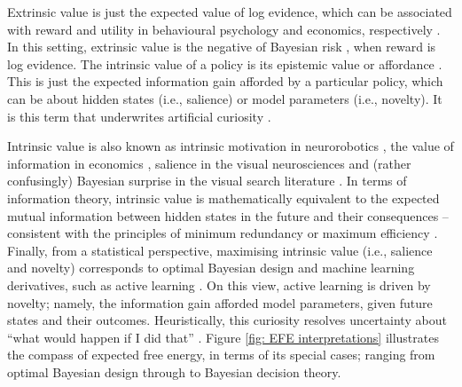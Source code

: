 \documentclass{article}
\begin{document}
Extrinsic value is just the expected value of log evidence, which can be associated with reward and utility in behavioural psychology and economics, respectively \cite{bartoNoveltySurprise2013,kauderGenesisMarginalUtility1953,schmidhuberFormalTheoryCreativity2010}. In this setting, extrinsic value is the negative of Bayesian risk \cite{bergerStatisticalDecisionTheory1985}, when reward is log evidence. The intrinsic value of a policy is its epistemic value or affordance \cite{fristonActiveInferenceEpistemic2015}. This is just the expected information gain afforded by a particular policy, which can be about hidden states (i.e., salience) or model parameters (i.e., novelty). It is this term that underwrites artificial curiosity \cite{schmidhuberDevelopmentalRoboticsOptimal2006}.

Intrinsic value is also known as intrinsic motivation in neurorobotics \cite{bartoNoveltySurprise2013,oudeyerWhatIntrinsicMotivation2009,deciIntrinsicMotivationSelfDetermination1985}, the value of information in economics \cite{howardInformationValueTheory1966}, salience in the visual neurosciences and (rather confusingly) Bayesian surprise in the visual search literature \cite{ittiBayesianSurpriseAttracts2009,schwartenbeckExplorationNoveltySurprise2013,sunPlanningBeSurprised2011}. In terms of information theory, intrinsic value is mathematically equivalent to the expected mutual information between hidden states in the future and their consequences – consistent with the principles of minimum redundancy or maximum efficiency \cite{barlowPossiblePrinciplesUnderlying1961,barlowInductiveInferenceCoding1974,linskerPerceptualNeuralOrganization1990}. Finally, from a statistical perspective, maximising intrinsic value (i.e., salience and novelty) corresponds to optimal Bayesian design \cite{lindleyMeasureInformationProvided1956} and machine learning derivatives, such as active learning \cite{mackayInformationBasedObjectiveFunctions1992}. On this view, active learning is driven by novelty; namely, the information gain afforded model parameters, given future states and their outcomes. Heuristically, this curiosity resolves uncertainty about “what would happen if I did that” \cite{schmidhuberFormalTheoryCreativity2010}. Figure \ref{fig: EFE interpretations} illustrates the compass of expected free energy, in terms of its special cases; ranging from optimal Bayesian design through to Bayesian decision theory.
\end{document}
